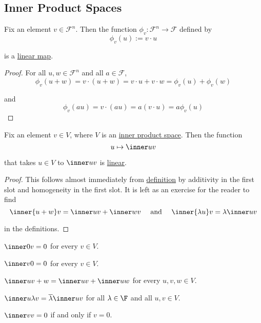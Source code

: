 \subsection{Inner Product Spaces}\label{cfb69c6}

\label{dcae040}

Fix an element $v\in\mathcal F^n$. Then the function $\phi_v:\mathcal
F^n\to\mathcal F$ defined by
$$
  \phi_v(u):=v\cdot u
$$

is a \href{d7d1925}{linear map}.

\begin{proof}
  For all $u,w\in\mathcal F^n$ and all $a\in\mathcal F$,
  $$
    \phi_v(u+w)
    =v\cdot(u+w)
    =v\cdot u +v\cdot w
    =\phi_v(u)+\phi_v(w)
  $$

  and
  $$
    \phi_v(au)=v\cdot(au)=a(v\cdot u)=a\phi_v(u)
  $$
\end{proof}

\label{b636029}

Fix an element $v\in V$, where $V$ is an \href{b9935c8}{inner product space}.
Then the function
$$
  u\mapsto\inner uv
$$

that takes $u\in V$ to $\inner uv$ is \href{d7d1925}{linear}.

\begin{proof}
  This follows almost immediately from \href{cebd07a}{definition} by additivity
  in the first slot and homogeneity in the first slot. It is left as an exercise
  for the reader to find
  $$
    \inner{u+w}v=\inner uv+\inner wv\quad\text{ and }\quad
    \inner{\lambda u}v=\lambda\inner uv
  $$

  in the definitions.
\end{proof}

\label{fb218c8}

\begin{enumerata}
  \item $\inner0v=0$ for every $v\in V$.
  \item $\inner v0=0$ for every $v\in V$.
  \item $\inner u{v+w}=\inner uv+\inner uw$ for every $u,v,w\in V$.
  \item $\inner u{\lambda v}=\overline\lambda\inner uv$ for all $\lambda\in\F$
  and all $u,v\in V$.
  \item $\inner vv=0$ if and only if $v=0$.
\end{enumerata}

